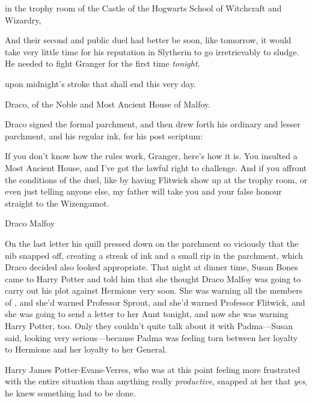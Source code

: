 \begin{writtenNote}
in the trophy room of the Castle of the Hogwarts School of Witchcraft and
Wizardry,
\end{writtenNote}

And their second and public duel had better be soon, like tomorrow, it would
take very little time for his reputation in Slytherin to go irretrievably to
sludge. He needed to fight Granger for the first time \emph{tonight}.

\begin{writtenNote}
upon midnight’s stroke that shall end this very day.

Draco, of the Noble and Most Ancient House of Malfoy.
\end{writtenNote}

Draco signed the formal parchment, and then drew forth his ordinary and lesser
parchment, and his regular ink, for his post scriptum:

\begin{writtenNote}
If you don’t know how the rules work, Granger, here’s how it is. You
insulted a Most Ancient House, and I’ve got the lawful right to challenge. And
if you affront the conditions of the duel, like by having Flitwick show up at
the trophy room, or even just telling anyone else, my father will take you and
your false honour straight to the Wizengamot.

Draco Malfoy
\end{writtenNote}

On the last letter his quill pressed down on the parchment so viciously that
the nib snapped off, creating a streak of ink and a small rip in the parchment,
which Draco decided also looked appropriate.
\later
That night at dinner time, Susan Bones came to Harry Potter and told him that
she thought Draco Malfoy was going to carry out his plot against Hermione very
soon. She was warning all the members of \SPHEW, and she’d warned Professor
Sprout, and she’d warned Professor Flitwick, and she was going to send a letter
to her Aunt tonight, and now she was warning Harry Potter, too. Only they
couldn’t quite talk about it with Padma—Susan said, looking very
serious—because Padma was feeling torn between her loyalty to Hermione and
her loyalty to her General.

Harry James Potter-Evans-Verres, who was at this point feeling more frustrated
with the entire situation than anything really \emph{productive}, snapped at
her that \emph{yes}, he knew something had to be done.

